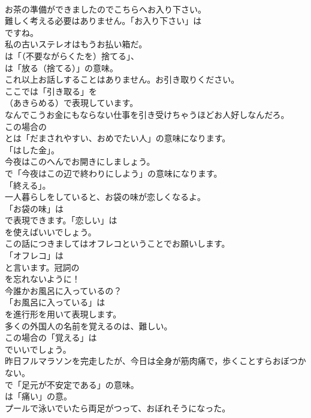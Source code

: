 \documentclass[8pt]{extreport}
\begin{document}
\begin{CJK}{UTF8}{min}
\\	お茶の準備ができましたのでこちらへお入り下さい。 
\\	難しく考える必要はありません。「お入り下さい」は
\\	ですね。	
\\	私の古いステレオはもうお払い箱だ。 
\\	は「（不要ながらくたを）捨てる」、
\\	は「放る（捨てる）」の意味。	
\\	これ以上お話しすることはありません。お引き取りください。 
\\	ここでは「引き取る」を 
\\	（あきらめる）で表現しています。	
\\	なんでこうお金にもならない仕事を引き受けちゃうほどお人好しなんだろ。 
\\	この場合の
\\	とは「だまされやすい、おめでたい人」の意味になります。
\\	「はした金」。	
\\	今夜はこのへんでお開きにしましょう。 
\\	で「今夜はこの辺で終わりにしよう」の意味になります。
\\	「終える」。	
\\	一人暮らしをしていると、お袋の味が恋しくなるよ。 
\\	「お袋の味」は
\\	で表現できます。「恋しい」は
\\	を使えばいいでしょう。	
\\	この話につきましてはオフレコということでお願いします。 
\\	「オフレコ」は
\\	と言います。冠詞の
\\	を忘れないように！	
\\	今誰かお風呂に入っているの？ 
\\	「お風呂に入っている」は 
\\	を進行形を用いて表現します。	
\\	多くの外国人の名前を覚えるのは、難しい。 
\\	この場合の「覚える」は
\\	でいいでしょう。	
\\	昨日フルマラソンを完走したが、今日は全身が筋肉痛で，歩くことすらおぼつかない。 
\\	で「足元が不安定である」の意味。
\\	は「痛い」の意。	
\\	プールで泳いでいたら両足がつって、おぼれそうになった。 

\end{CJK}
\end{document}
